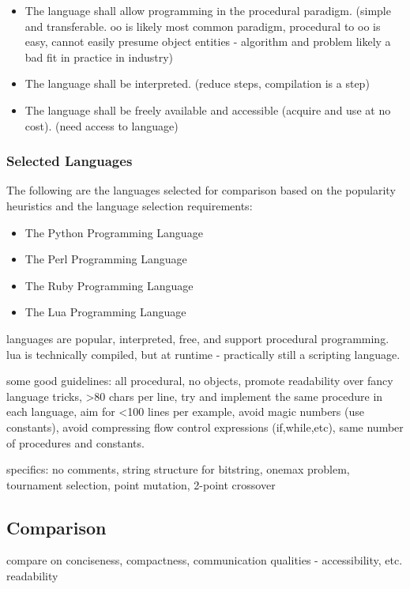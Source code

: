 \documentclass[a4paper, 11pt]{article}
\begin{document}
\begin{itemize}
	\item The language shall allow programming in the procedural paradigm. (simple and transferable. oo is likely most common paradigm, procedural to oo is easy, cannot easily presume object entities - algorithm and problem likely a bad fit in practice in industry)
	\item The language shall be interpreted. (reduce steps, compilation is a step)
	\item The language shall be freely available and accessible (acquire and use at no cost). (need access to language)
\end{itemize}

% 
% 
\subsubsection{Selected Languages}
\label{subsubsec:selection}
The following are the languages selected for comparison based on the popularity heuristics and the language selection requirements:

\begin{itemize}
	\item The Python Programming Language
	\item The Perl Programming Language
	\item The Ruby Programming Language
	\item The Lua Programming Language
\end{itemize}

languages are popular, interpreted, free, and support procedural programming. lua is technically compiled, but at runtime - practically still a scripting language.

some good guidelines: all procedural, no objects, promote readability over fancy language tricks, >80 chars per line, try and implement the same procedure in each language, aim for <100 lines per example, avoid magic numbers (use constants), avoid compressing flow control expressions (if,while,etc), same number of procedures and constants.

specifics: no comments, string structure for bitstring, onemax problem, tournament selection, point mutation, 2-point crossover

% 
% 
\subsection{Comparison}
compare on conciseness, compactness, communication qualities - accessibility, etc. readability
\end{document}
